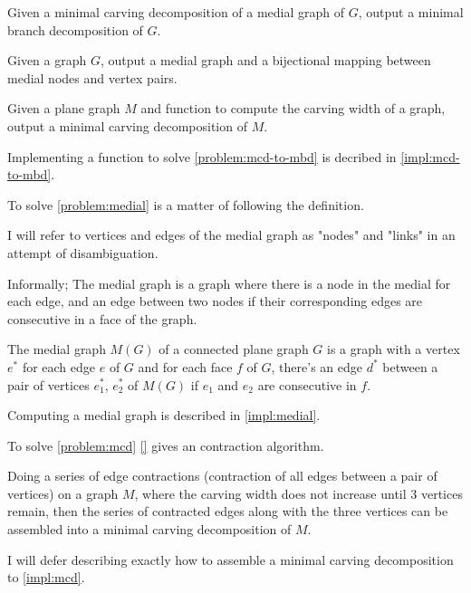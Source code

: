 \documentclass{article}
\begin{document}
	\begin{problem}\label{problem:mcd-to-mbd}
		Given a minimal carving decomposition of a medial graph of $G$, output a minimal branch decomposition of $G$.
	\end{problem}

	\begin{problem}\label{problem:medial}
		Given a graph $G$, output a medial graph and a bijectional mapping between medial nodes and vertex pairs.
	\end{problem}

	\begin{problem}\label{problem:mcd}
		Given a plane graph $M$ and function to compute the carving width of a graph, output a minimal carving decomposition of $M$.
	\end{problem}

	Implementing a function to solve \ref{problem:mcd-to-mbd} is decribed in \ref{impl:mcd-to-mbd}.

	To solve \ref{problem:medial} is a matter of following the definition.

	I will refer to vertices and edges of the medial graph as "nodes" and "links" in an attempt of disambiguation. 

	Informally; The medial graph is a graph where there is a node in the medial for each edge, and an edge between two nodes if their corresponding edges are consecutive in a face of the graph.

	\begin{definition}
		The medial graph $M(G)$ of a connected plane graph $G$ is a graph with a vertex $e^*$ for each edge $e$ of $G$ and for each face $f$ of $G$, there's an edge $d^*$ between a pair of vertices $e_1^*$, $e_2^*$ of $M(G)$ if $e_1$ and $e_2$ are consecutive in $f$.
	\end{definition}

	Computing a medial graph is described in \ref{impl:medial}.

	To solve \ref{problem:mcd} \ref{} gives an contraction algorithm.

	Doing a series of edge contractions (contraction of all edges between a pair of vertices) on a graph $M$, where the carving width does not increase until 3 vertices remain, then the series of contracted edges along with the three vertices can be assembled into a minimal carving decomposition of $M$.
	
	I will defer describing exactly how to assemble a minimal carving decomposition to \ref{impl:mcd}.
\end{document}
